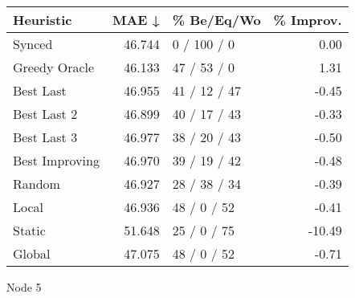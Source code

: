 \begin{tabular}{lrlr}
\toprule
\textbf{Heuristic} & \textbf{MAE ↓} & \textbf{\% Be/Eq/Wo} & \textbf{\% Improv.} \\
\midrule
            Synced &         46.744 &          0 / 100 / 0 &                0.00 \\
     Greedy Oracle &         46.133 &          47 / 53 / 0 &                1.31 \\
         Best Last &         46.955 &         41 / 12 / 47 &               -0.45 \\
       Best Last 2 &         46.899 &         40 / 17 / 43 &               -0.33 \\
       Best Last 3 &         46.977 &         38 / 20 / 43 &               -0.50 \\
    Best Improving &         46.970 &         39 / 19 / 42 &               -0.48 \\
            Random &         46.927 &         28 / 38 / 34 &               -0.39 \\
             Local &         46.936 &          48 / 0 / 52 &               -0.41 \\
            Static &         51.648 &          25 / 0 / 75 &              -10.49 \\
            Global &         47.075 &          48 / 0 / 52 &               -0.71 \\
\bottomrule
\end{tabular}
\caption{Node 5}
\label{tab:iid_lr05_le1_bs2_5}
